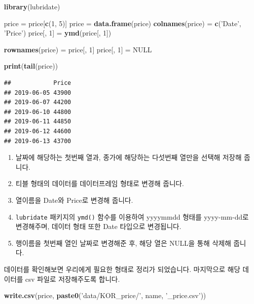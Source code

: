 \documentclass[]{book}
\newenvironment{Shaded}{\begin{snugshade}}{\end{snugshade}}
\newcommand{\DecValTok}[1]{\textcolor[rgb]{0.00,0.00,0.81}{#1}}
\newcommand{\KeywordTok}[1]{\textcolor[rgb]{0.13,0.29,0.53}{\textbf{#1}}}
\newcommand{\NormalTok}[1]{#1}
\newcommand{\OtherTok}[1]{\textcolor[rgb]{0.56,0.35,0.01}{#1}}
\newcommand{\StringTok}[1]{\textcolor[rgb]{0.31,0.60,0.02}{#1}}
\providecommand{\tightlist}{%
  \setlength{\itemsep}{0pt}\setlength{\parskip}{0pt}}
\begin{document}
\begin{Shaded}
\begin{Highlighting}[]
\KeywordTok{library}\NormalTok{(lubridate)}

\NormalTok{price =}\StringTok{ }\NormalTok{price[}\KeywordTok{c}\NormalTok{(}\DecValTok{1}\NormalTok{, }\DecValTok{5}\NormalTok{)] }
\NormalTok{price =}\StringTok{ }\KeywordTok{data.frame}\NormalTok{(price)}
\KeywordTok{colnames}\NormalTok{(price) =}\StringTok{ }\KeywordTok{c}\NormalTok{(}\StringTok{'Date'}\NormalTok{, }\StringTok{'Price'}\NormalTok{)}
\NormalTok{price[, }\DecValTok{1}\NormalTok{] =}\StringTok{ }\KeywordTok{ymd}\NormalTok{(price[, }\DecValTok{1}\NormalTok{])}

\KeywordTok{rownames}\NormalTok{(price) =}\StringTok{ }\NormalTok{price[, }\DecValTok{1}\NormalTok{]}
\NormalTok{price[, }\DecValTok{1}\NormalTok{] =}\StringTok{ }\OtherTok{NULL}

\KeywordTok{print}\NormalTok{(}\KeywordTok{tail}\NormalTok{(price))}
\end{Highlighting}
\end{Shaded}

\begin{verbatim}
##            Price
## 2019-06-05 43900
## 2019-06-07 44200
## 2019-06-10 44800
## 2019-06-11 44850
## 2019-06-12 44600
## 2019-06-13 43700
\end{verbatim}

\begin{enumerate}
\def\labelenumi{\arabic{enumi}.}
\tightlist
\item
  날짜에 해당하는 첫번째 열과, 종가에 해당하는 다섯번째 열만을 선택해 저장해 줍니다.
\item
  티블 형태의 데이터를 데이터프레임 형태로 변경해 줍니다.
\item
  열이름을 Date와 Price로 변경해 줍니다.
\item
  \texttt{lubridate} 패키지의 \texttt{ymd()} 함수를 이용하여 yyyymmdd 형태를 yyyy-mm-dd로 변경해주며, 데이터 형태 또한 Date 타입으로 변경됩니다.
\item
  행이름을 첫번째 열인 날짜로 변경해준 후, 해당 열은 NULL을 통해 삭제해 줍니다.
\end{enumerate}

데이터를 확인해보면 우리에게 필요한 형태로 정리가 되었습니다. 마지막으로 해당 데이터를 csv 파일로 저장해주도록 합니다.

\begin{Shaded}
\begin{Highlighting}[]
\KeywordTok{write.csv}\NormalTok{(price, }\KeywordTok{paste0}\NormalTok{(}\StringTok{'data/KOR_price/'}\NormalTok{, name, }\StringTok{'_price.csv'}\NormalTok{))}
\end{Highlighting}
\end{Shaded}
\end{document}
